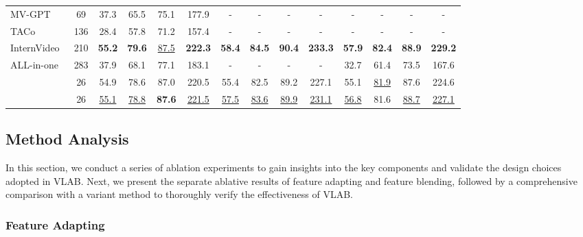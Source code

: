 \documentclass{article}
\begin{document}
\begin{table*}[]
\begin{tabular}{l|c|cccc|cccc|cccc}
         MV-GPT~\cite{seo2022end}              &69        &37.3 &65.5 &75.1 &177.9 &-    &-    &-    &- &-     &-    &-    &-\\
         TACo~\cite{yang2021taco}           &136       &28.4 &57.8 &71.2 &157.4 &-    &-    &-    &- &-     &-    &-    &-\\
         InternVideo~\cite{wang2022internvideo} &210   &\textbf{55.2} &\textbf{79.6}    &\underline{87.5}    &\textbf{222.3} &\textbf{58.4} &\textbf{84.5}    &\textbf{90.4}    &\textbf{233.3} &\textbf{57.9}  &\textbf{82.4}    &\textbf{88.9}    &\textbf{229.2}\\
         ALL-in-one~\cite{wang2022all}      &283       &37.9 &68.1 &77.1 &183.1 &-    &-    &-    &-  &32.7 &61.4 &73.5 &167.6\\

         \midrule
          &26  &54.9 &78.6 &87.0 & 220.5 &55.4 &82.5 &89.2 &227.1 &55.1 &\underline{81.9} &87.6 &224.6  \\
          &26 & \underline{55.1} & \underline{78.8} & \textbf{87.6} & \underline{221.5} &\underline{57.5} &\underline{83.6} &\underline{89.9} &\underline{231.1} &\underline{56.8} & 81.6 & \underline{88.7} &\underline{227.1}  \\
         \bottomrule
    \end{tabular}

    \label{tab:video_retrieval}
\end{table*}


\subsection{Method Analysis}

In this section, we conduct a series of ablation experiments to gain insights into the key components and validate the design choices adopted in VLAB. Next, we present the separate ablative results of feature adapting and feature blending, followed by a comprehensive comparison with a variant method to thoroughly verify the effectiveness of VLAB.

\subsubsection{Feature Adapting} 
\label{sec:va}
\end{document}
